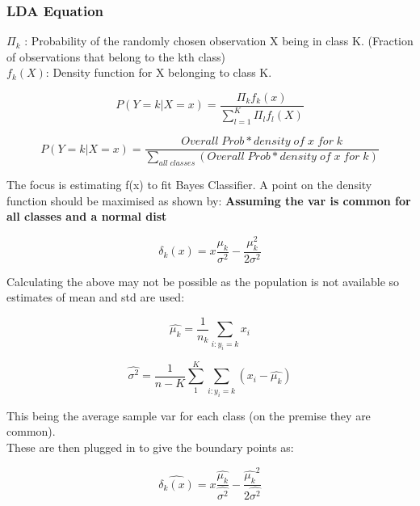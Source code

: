 \documentclass[11pt]{scrartcl} %
\begin{document}
\subsubsection{LDA Equation}

\(\Pi_k\) : Probability of the randomly chosen observation X being in class K. (Fraction of observations that belong to the kth class)\\

\(f_k(X)\): Density function for X belonging to class K.

\begin{equation}
	P(Y=k|X=x) = \frac{\Pi_kf_k(x)}{\sum^K_{l=1}{\Pi_lf_l(X)}}
\end{equation}

\begin{equation}
	P(Y=k|X=x) = \frac{Overall\; Prob * density\; of \; x \; for \; k}{\sum_{all\; classes}(Overall\; Prob * density\; of \; x \; for \; k)}
\end{equation}

The focus is estimating f(x) to fit Bayes Classifier. A point on the density function should be maximised as shown by:
\textbf{Assuming the var is common for all classes and a normal dist}

\begin{equation}
	\delta_k(x) = x\frac{\mu_k}{\sigma^2} - \frac{\mu_k^2}{2\sigma^2}
\end{equation}

Calculating the above may not be possible as the population is not available so estimates of mean and std are used:

\begin{equation}
	\hat{\mu_k} = \frac{1}{n_k}\sum_{i:y_i=k}{x_i}
\end{equation}


\begin{equation}
	\hat{\sigma^2}  = \frac{1}{n-K}\sum^K_1\sum_{i:y_i=k}(x_i - \hat{\mu_k})
\end{equation}

This being the average sample var for each class (on the premise they are common).\\

These are then plugged in to give the boundary points as:

\begin{equation}
	\hat{\delta_k(x)} = x\frac{\hat{\mu_k}}{\hat{\sigma^2}} - \frac{\hat{\mu_k}^2}{2\hat{\sigma^2}}
\end{equation}
\end{document}
